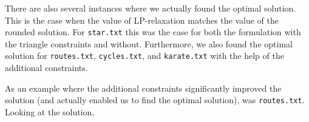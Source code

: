 \documentclass{article}
\begin{document}
There are also several instances where we actually found the optimal solution. This is the case when the value of LP-relaxation matches the value of the rounded solution. For \lstinline|star.txt| this was the case for both the formulation with the triangle constraints and without. Furthermore, we also found the optimal solution for \lstinline|routes.txt|, \lstinline|cycles.txt|, and \lstinline|karate.txt| with the help of the additional constraints. 

As an example where the additional constraints significantly improved the solution (and actually enabled us to find the optimal solution), was \lstinline|routes.txt|. Looking at the solution, 







\end{document}
